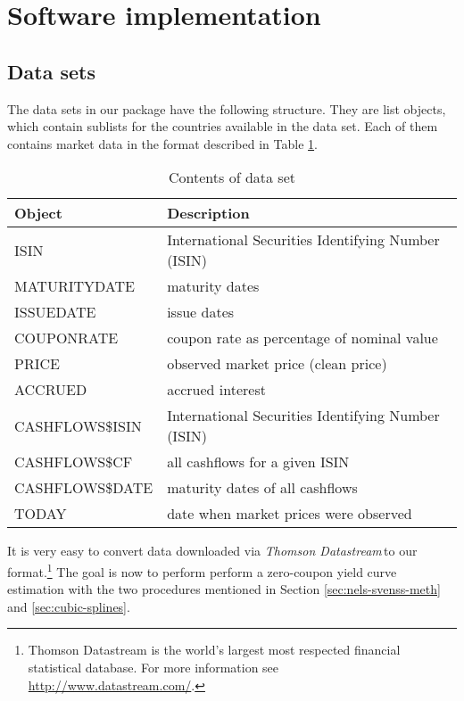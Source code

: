 \section{Software implementation}
\label{sec:soft-impl}

\subsection{Data sets}

The data sets in our package have the following structure. They are list objects, which contain sublists for the countries available in the data set. Each of them contains market data in the format described in Table \ref{tab:dataset}.

\begin{table}[htb]
  \centering
  \begin{tabular}[htb]{ll}
\hline
    \textbf{Object} & \textbf{Description} \\
\hline
ISIN & International Securities Identifying Number (ISIN)\\
MATURITYDATE & maturity dates\\
ISSUEDATE & issue dates\\
COUPONRATE & coupon rate as percentage of nominal value\\
PRICE & observed market price (clean price)\\
ACCRUED & accrued interest\\
CASHFLOWS\$ISIN & International Securities Identifying Number (ISIN)\\
CASHFLOWS\$CF & all cashflows for a given ISIN\\
CASHFLOWS\$DATE & maturity dates of all cashflows\\
TODAY & date when market prices were observed\\
\hline  
\end{tabular}
  \caption{Contents of data set}
\label{tab:dataset}
\end{table}

It is very easy to convert data downloaded via \emph{Thomson Datastream}\texttrademark\,to our format.\footnote{Thomson Datastream is the world's largest most respected financial statistical database. For more information see \url{http://www.datastream.com/}.} The goal is now to perform perform a zero-coupon yield curve estimation with the two procedures mentioned in Section \ref{sec:nels-svenss-meth} and \ref{sec:cubic-splines}.


